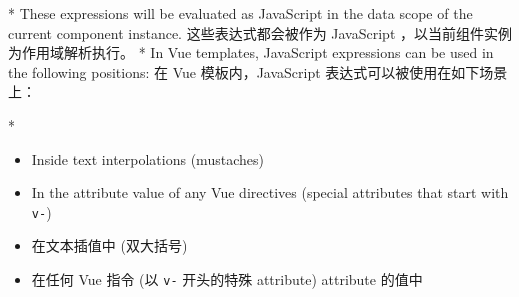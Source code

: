 \begin{paracol}{2}

\switchcolumn[0]*%
These expressions will be evaluated as JavaScript in the data scope of
the current component instance.
\switchcolumn
这些表达式都会被作为 JavaScript ，以当前组件实例为作用域解析执行。
\switchcolumn[0]*%
In Vue templates, JavaScript expressions can be used in the following
positions:
\switchcolumn
在 Vue 模板内，JavaScript 表达式可以被使用在如下场景上：

\switchcolumn[0]*%
\begin{itemize}
\item
Inside text interpolations (mustaches)
\item
In the attribute value of any Vue directives (special attributes that
start with \texttt{v-})
\end{itemize}
\switchcolumn
\begin{itemize}
\item
在文本插值中 (双大括号)
\item
在任何 Vue 指令 (以 \texttt{v-} 开头的特殊 attribute) attribute 的值中
\end{itemize}

\end{paracol}
